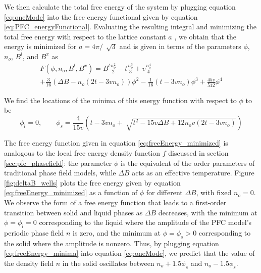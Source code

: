 We then calculate the total free energy of the system by plugging equation \ref{eq:oneMode} into the free energy functional given by equation \ref{eq:PFC_energyFunctional}. Evaluating the resulting integral and minimizing the total free energy with respect to the lattice constant $a$ \cite{provatas_PFC}, we obtain that the energy is minimized for $a=4\pi/\,\sqrt[]{3}$ and is given in terms of the parameters $\phi$, $n_o$, $B^l$, and $B^x$ as
\begin{multline}\label{eq:freeEnergy_minimized}
F(\phi, n_o, B^l, B^x) = B^l\frac{n_o^2}{2} -t\frac{n_o^3}{3}+v\frac{n_o^4}{4} \\ +\frac{3}{16}(\Delta B -n_o(2t-3vn_o))\phi^2 -\frac{1}{16}(t-3vn_o)\phi^3 + \frac{45v}{512}\phi^4
\end{multline}

We find the locations of the minima of this energy function with respect to $\phi$ to be
\begin{equation}\label{eq:freeEnergy_minima}
\phi_l=0 , \qquad \phi_s = \frac{4}{15v}\left(t-3 v n_o +\sqrt[]{t^2-15v\Delta B +12n_o v(2t-3vn_o)} \right)
\end{equation}

The free energy function given in equation \ref{eq:freeEnergy_minimized} is analogous to the local free energy density function $f$ discussed in section \ref{sec:pfc_phasefield}: the parameter $\phi$ is the equivalent of the order parameters of traditional phase field models, while $\Delta B$ acts as an effective temperature. Figure \ref{fig:deltaB_wells} plots the free energy given by equation \ref{eq:freeEnergy_minimized} as a function of $\phi$ for different $\Delta B$, with fixed $n_o=0$. We observe the form of a free energy function that leads to a first-order transition between solid and liquid phases as $\Delta B$ decreases, with the minimum at $\phi=\phi_l=0$ corresponding to the liquid where the amplitude of the PFC model's periodic phase field $n$ is zero, and the minimum at $\phi=\phi_s>0$ corresponding to the solid where the amplitude is nonzero. Thus, by plugging equation \ref{eq:freeEnergy_minima} into equation \ref{eq:oneMode}, we predict that the value of the density field $n$ in the solid oscillates between $n_o+1.5\phi_s$ and $n_o-1.5\phi_s$.


